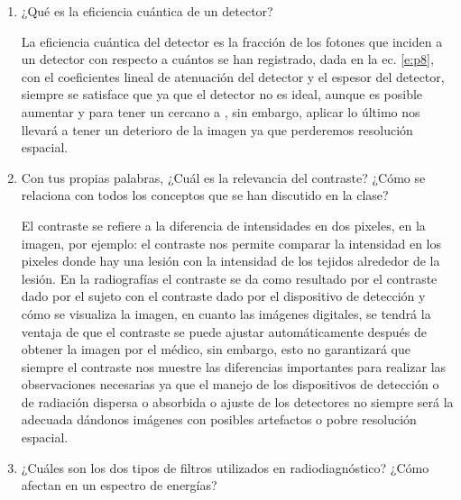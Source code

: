 \begin{enumerate}[1.]
\item ¿Qué es la eficiencia cuántica de un detector?

La eficiencia cuántica del detector  es la fracción de los fotones que inciden a un detector con respecto a cuántos se han registrado, dada en la ec. \ref{e:p8}, con  el coeficientes lineal de atenuación del detector y  el espesor del detector, siempre se satisface que  ya que el detector no es ideal, aunque es posible aumentar  y  para tener un  cercano a , sin embargo, aplicar lo último nos llevará a tener un deterioro de la imagen ya que perderemos resolución espacial.





\pagebreak

\item Con tus propias palabras, ¿Cuál es la relevancia del contraste? ¿Cómo se relaciona con todos los conceptos que se han discutido en la clase?


El contraste se refiere a la diferencia de intensidades en dos pixeles, en la imagen, por ejemplo: el contraste nos permite comparar la intensidad en los pixeles donde hay una lesión con la intensidad de los tejidos alrededor de la lesión.  En la radiografías el contraste se da  como resultado  por el contraste dado por el sujeto con el contraste dado por el dispositivo de detección y cómo se visualiza la imagen, en cuanto las imágenes digitales, se tendrá la ventaja de que el contraste se puede ajustar automáticamente después de obtener la imagen por el médico, sin embargo, esto no garantizará que siempre el contraste nos muestre las diferencias importantes para realizar las observaciones necesarias ya que el manejo de los dispositivos de detección o  de radiación dispersa o absorbida o ajuste de  los detectores no siempre será la adecuada dándonos imágenes con posibles artefactos o pobre resolución espacial.











\item ¿Cuáles son los dos tipos de filtros utilizados en radiodiagnóstico? ¿Cómo afectan en un espectro de energías?
\end{enumerate}


